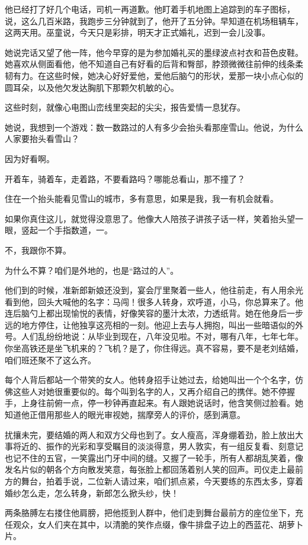 \documentclass[lang=cn,newtx,12pt,scheme=chinese]{elegantbook}
\begin{document}
他已经打了好几个电话，司机一再道歉。他盯着手机地图上追踪到的车子图标，说，这么几百米路，我跑步三分钟就到了，他开了五分钟。早知道在机场租辆车，这两天用。巫童说，今天只是彩排，明天才正式婚礼，迟到一会儿没事。

她说完话又望了他一阵，他今早穿的是为参加婚礼买的墨绿波点衬衣和苔色皮鞋。她喜欢从侧面看他，他不知道自己有好看的后背和臀部，脖颈微微往前伸的线条柔韧有力。在这些时候，她决心好好爱他，爱他后脑勺的形状，爱那一块小点心似的圆耳朵，以及他欠发达胸肌下那颗欠机敏的心。

这些时刻，就像心电图山峦线里突起的尖尖，报告爱情一息犹存。

她说，我想到一个游戏：数一数路过的人有多少会抬头看那座雪山。他说，为什么人家要抬头看雪山？

因为好看啊。

开着车，骑着车，走着路，不要看路吗？哪能总看山，那不撞了？

住在一个抬头能看见雪山的城市，多有意思，如果是我，我一有机会就看。

如果你真住这儿，就觉得没意思了。他像大人陪孩子讲孩子话一样，笑着抬头望一眼，竖起一个手指数道，一。

不，我跟你不算。

为什么不算？咱们是外地的，也是“路过的人”。

他们到的时候，准新郎新娘还没到，宴会厅里聚着一些人，他往前走，有人用余光看到他，回头大喊他的名字：马闯！很多人转身，欢呼道，小马，你总算来了。他连后脑勺上都出现愉悦的表情，好像笑容的墨汁太浓，力透纸背。她在他身后一步远的地方停住，让他独享这亮相的一刻。他迎上去与人拥抱，叫出一些暗语似的外号。人们乱纷纷地说：从毕业到现在，八年没见啦。不对，哪有八年，七年七年。你坐高铁还是坐飞机来的？飞机？是了，你住得远。真不容易，要不是老刘结婚，咱们班还聚不了这么齐。

每个人背后都站一个带笑的女人。他转身招手让她过去，给她叫出一个个名字，仿佛这些人对她很重要似的。每个叫到名字的人，又再介绍自己的携伴。她不停握手，上身往前俯一点，停一秒钟再直起来。有人跟她说话时，他含笑侧过脸看。她知道他正借用那些人的眼光审视她，揣摩旁人的评价，感到满意。

扰攘未完，要结婚的两人和双方父母也到了。女人瘦高，浑身绷着劲，脸上放出大事将近的、振作的光彩和享受瞩目的淡淡得意，男人敦实，有一组反复看、刻意记也记不住的五官，一笑露出门牙中间的缝。又握了一轮手，所有人都胡乱笑着，像发名片似的朝各个方向散发笑意，每张脸上都回荡着别人笑的回声。司仪走上最前方的舞台，拍着手说，二位新人请过来，咱们抓点紧，今天要练的东西太多，穿着婚纱怎么走，怎么转身，新郎怎么掀头纱，快！

两条胳膊左右搂住他肩膀，把他揽到人群中，他们走到舞台最前方的座位坐下，充任观众，女人们夹在其中，以清脆的笑作点缀，像牛排盘子边上的西蓝花、胡萝卜片。
\end{document}

